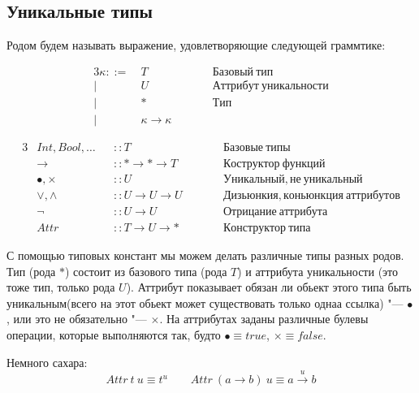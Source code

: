 \subsection{\texorpdfstring{Уникальные типы}{Unique types}}
\begin{definition}[Род]
	Родом будем называть выражение, удовлетворяющие следующей граммтике:
	\begin{bnf}
	\begin{alignat*}{3}
		\kappa ::= &\ T && \qquad Базовый~тип \\
				 | &\ U && \qquad Аттрибут~уникальности \\
				 | &\ * && \qquad Тип \\
				 | &\ \kappa \rightarrow \kappa
	\end{alignat*}
	\end{bnf}
\end{definition}
\begin{definition}
	\begin{bnf}
	\begin{alignat*}{3}
		& Int, Bool,\hdots && :: T && \qquad Базовые~типы \\
		& \rightarrow      && :: * \rightarrow * \rightarrow T && \qquad Коструктор~функций \\
		& \bullet, \times  && :: U && \qquad Уникальный, не~уникальный \\
		& \vee, \wedge     && :: U \rightarrow U \rightarrow U && \qquad Дизьюнкия, коньюнкция~аттрибутов \\
		& \neg             && :: U \rightarrow U && \qquad Отрицание~аттрибута \\
		& Attr             && :: T \rightarrow U \rightarrow * && \qquad Конструктор~типа
	\end{alignat*}
	\end{bnf}
\end{definition}
С помощью типовых констант мы можем делать различные типы разных родов. 
Тип (рода $*$) состоит из базового типа (рода $T$) и аттрибута уникальности (это тоже тип, только рода $U$). 
Аттрибут показывает обязан ли обьект этого типа быть уникальным(всего на этот обьект может существовать только однаа ссылка) "--- $\bullet$,
или это не обязательно "--- $\times$.
На аттрибутах заданы различные булевы операции, которые выполняются так, будто $\bullet \equiv true$, $\times \equiv false$.

Немного сахара:
\[
	Attr~t~u \equiv t^u \qquad Attr~(a \rightarrow b)~u \equiv a \xrightarrow{u} b
\]

